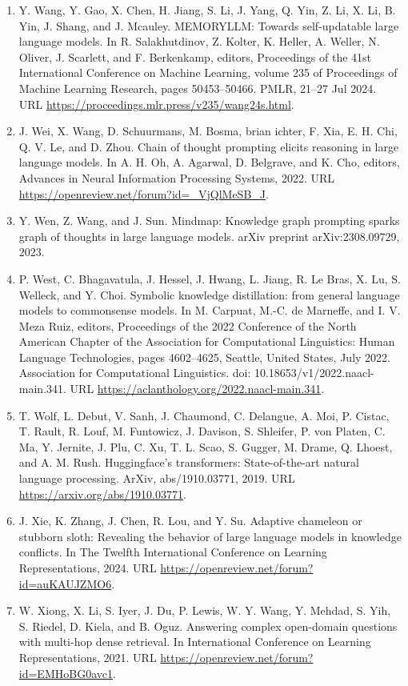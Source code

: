 \documentclass[11pt,UTF8,fontset=fandol]{ctexart}
\begin{document}
\begin{enumerate}[leftmargin=2em]
\item Y. Wang, Y. Gao, X. Chen, H. Jiang, S. Li, J. Yang, Q. Yin, Z. Li, X. Li, B. Yin, J. Shang, and J. Mcauley. MEMORYLLM: Towards self-updatable large language models. In R. Salakhutdinov, Z. Kolter, K. Heller, A. Weller, N. Oliver, J. Scarlett, and F. Berkenkamp, editors, Proceedings of the 41st International Conference on Machine Learning, volume 235 of Proceedings of Machine Learning Research, pages 50453--50466. PMLR, 21--27 Jul 2024. URL \url{https://proceedings.mlr.press/v235/wang24s.html}.
\item J. Wei, X. Wang, D. Schuurmans, M. Bosma, brian ichter, F. Xia, E. H. Chi, Q. V. Le, and D. Zhou. Chain of thought prompting elicits reasoning in large language models. In A. H. Oh, A. Agarwal, D. Belgrave, and K. Cho, editors, Advances in Neural Information Processing Systems, 2022. URL \url{https://openreview.net/forum?id=_VjQlMeSB_J}.
\item Y. Wen, Z. Wang, and J. Sun. Mindmap: Knowledge graph prompting sparks graph of thoughts in large language models. arXiv preprint arXiv:2308.09729, 2023.
\item P. West, C. Bhagavatula, J. Hessel, J. Hwang, L. Jiang, R. Le Bras, X. Lu, S. Welleck, and Y. Choi. Symbolic knowledge distillation: from general language models to commonsense models. In M. Carpuat, M.-C. de Marneffe, and I. V. Meza Ruiz, editors, Proceedings of the 2022 Conference of the North American Chapter of the Association for Computational Linguistics: Human Language Technologies, pages 4602--4625, Seattle, United States, July 2022. Association for Computational Linguistics. doi: 10.18653/v1/2022.naacl-main.341. URL \url{https://aclanthology.org/2022.naacl-main.341}.
\item T. Wolf, L. Debut, V. Sanh, J. Chaumond, C. Delangue, A. Moi, P. Cistac, T. Rault, R. Louf, M. Funtowicz, J. Davison, S. Shleifer, P. von Platen, C. Ma, Y. Jernite, J. Plu, C. Xu, T. L. Scao, S. Gugger, M. Drame, Q. Lhoest, and A. M. Rush. Huggingface's transformers: State-of-the-art natural language processing. ArXiv, abs/1910.03771, 2019. URL \url{https://arxiv.org/abs/1910.03771}.
\item J. Xie, K. Zhang, J. Chen, R. Lou, and Y. Su. Adaptive chameleon or stubborn sloth: Revealing the behavior of large language models in knowledge conflicts. In The Twelfth International Conference on Learning Representations, 2024. URL \url{https://openreview.net/forum?id=auKAUJZMO6}.
\item W. Xiong, X. Li, S. Iyer, J. Du, P. Lewis, W. Y. Wang, Y. Mehdad, S. Yih, S. Riedel, D. Kiela, and B. Oguz. Answering complex open-domain questions with multi-hop dense retrieval. In International Conference on Learning Representations, 2021. URL \url{https://openreview.net/forum?id=EMHoBG0avc1}.

\end{enumerate}
\end{document}
